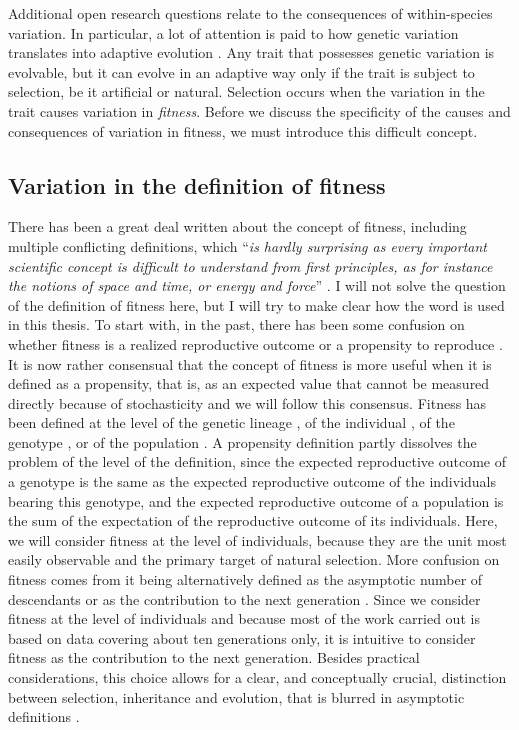 Additional open research questions relate to the consequences of within-species variation. In particular, a lot of attention is paid to how genetic variation translates into adaptive evolution \parencite{Brookfield2016}.
Any trait that possesses genetic variation is evolvable, but it can evolve in an adaptive way only if the trait is subject to selection, be it artificial or natural. Selection occurs when the variation in the trait causes variation in \emph{fitness}. Before we discuss the specificity of the causes and consequences of variation in fitness, we must introduce this difficult concept.

\subsection{Variation in the definition of fitness}
There has been a great deal written about the concept of fitness, including multiple conflicting definitions, which ``\emph{is hardly surprising as every important scientific concept is difficult to understand from first principles, as for instance the notions of space and time, or energy and force}'' \parencite[p. 1358][]{Wagner2010}. I will not solve the question of the definition of fitness here, but I will try to make clear how the word is used in this thesis. To start with, in the past, there has been some confusion on whether fitness is a realized reproductive outcome or a propensity to reproduce \parencite{Brandon1984}. It is now rather consensual that the concept of fitness is more useful when it is defined as a propensity, that is, as an expected value that cannot be measured directly because of stochasticity \parencite{Brandon1984,Price1996,Krimbas2004} and we will follow this consensus. Fitness has been defined at the level of the genetic lineage \parencite[e.g.][]{Akc2016}, of the individual \parencite[e.g.][]{Cam2000}, of the genotype \parencite[e.g.][]{Steiner2012}, or of the population \parencite[e.g.][]{vanTienderen2000}. A propensity definition partly dissolves the problem of the level of the definition, since the expected reproductive outcome of a genotype is the same as the expected reproductive outcome of the individuals bearing this genotype, and the expected reproductive outcome of a population is the sum of the expectation of the reproductive outcome of its individuals. Here, we will consider fitness at the level of individuals, because they are the unit most easily observable and the primary target of natural selection.
More confusion on fitness comes from it being alternatively defined as the asymptotic number of descendants or as the contribution to the next generation \parencite{Wade2006}. Since we consider fitness at the level of individuals and because most of the work carried out is based on data covering about ten generations only, it is intuitive to consider fitness as the contribution to the next generation. Besides practical considerations, this choice allows for a clear, and conceptually crucial, distinction between selection, inheritance and evolution, that is blurred in asymptotic definitions \parencite{Fisher1930, Arnold1984}. 
